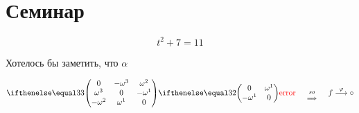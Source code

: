 \section{Семинар}

\begin{equation*}
    t^2 + 7 = 11
\end{equation*}

Хотелось бы заметить, что $\alpha$ 

\begin{equation*}
    \skmat{3}{\omega^1}{\omega^2}{\omega^3} 
    \hspace{0.5cm} \overset{so}{\underset{\Longrightarrow}{}} \hspace{0.5cm} 
    f
    \overset{\varphi}{\longrightarrow} \circ
\end{equation*}




